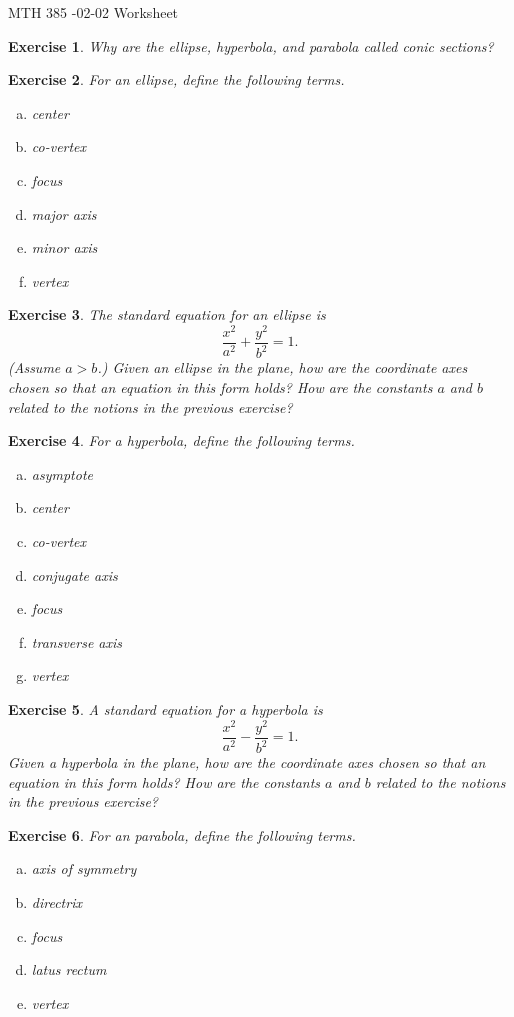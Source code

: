\documentclass[12pt]{article}
\theoremstyle{plain}
\newtheorem{ex}{Exercise}
\begin{document}
MTH 385 -02-02 Worksheet

\begin{ex}
  Why are the ellipse, hyperbola, and parabola called conic sections?
\end{ex}

\begin{ex}
  For an ellipse, define the following terms.
  \begin{enumerate}[(a)]
    \item center
    \item co-vertex
    \item focus
    \item major axis
    \item minor axis
    \item vertex
  \end{enumerate}
\end{ex}

\begin{ex}
  The standard equation for an ellipse is
  \[
    \frac{x^2}{a^2}+\frac{y^2}{b^2}=1.
  \]
  (Assume $a>b$.) Given an ellipse in the plane, how are the coordinate axes chosen so that an equation in this form holds? How are the constants $a$ and $b$ related to the notions in the previous exercise?
\end{ex}

\begin{ex}
  For a hyperbola, define the following terms.
  \begin{enumerate}[(a)]
    \item asymptote
    \item center
    \item co-vertex
    \item conjugate axis
    \item focus
    \item transverse axis
    \item vertex
  \end{enumerate}
\end{ex}

\begin{ex}
  A standard equation for a hyperbola is
  \[
    \frac{x^2}{a^2}-\frac{y^2}{b^2}=1.
  \]
  Given a hyperbola in the plane, how are the coordinate axes chosen so that an equation in this form holds? How are the constants $a$ and $b$ related to the notions in the previous exercise?
\end{ex}

\begin{ex}
  For an parabola, define the following terms.
  \begin{enumerate}[(a)]
    \item axis of symmetry
    \item directrix
    \item focus
    \item latus rectum
    \item vertex
  \end{enumerate}
\end{ex}
\end{document}
